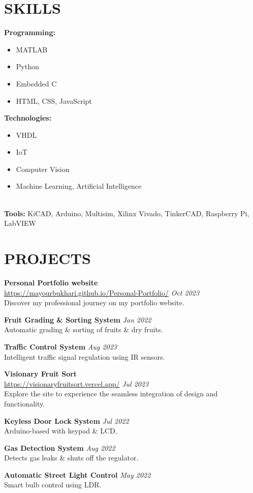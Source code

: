 \documentclass[a4paper,10pt]{article}
\begin{document}
\section{SKILLS}
\begin{minipage}{0.5\textwidth}
    \textbf{Programming:}
    \begin{itemize}[left=0pt]
        \item MATLAB
        \item Python
        \item Embedded C
        \item HTML, CSS, JavaScript
    \end{itemize}
\end{minipage}%
\begin{minipage}{0.5\textwidth}
    \textbf{Technologies:}
    \begin{itemize}[left=0pt]
        \item VHDL
        \item IoT
        \item Computer Vision
        \item Machine Learning, Artificial Intelligence 
    \end{itemize}
\end{minipage}\\

\textbf{Tools:} KiCAD, Arduino, Multisim, Xilinx Vivado, TinkerCAD, Raspberry Pi, LabVIEW

\section{PROJECTS}
\textbf{Personal Portfolio website} \\
\url{https://mayourbukhari.github.io/Personal-Portfolio/} \hfill \textit{Oct 2023} \\
Discover my professional journey on my portfolio website.

\textbf{Fruit Grading \& Sorting System} \hfill \textit{Jan 2022} \\
Automatic grading \& sorting of fruits \& dry fruits.

\textbf{Traffic Control System} \hfill \textit{Aug 2023} \\
Intelligent traffic signal regulation using IR sensors.

\textbf{Visionary Fruit Sort} \\
\url{https://visionaryfruitsort.vercel.app/} \hfill \textit{Jul 2023} \\
Explore the site to experience the seamless integration of design and functionality.

\textbf{Keyless Door Lock System} \hfill \textit{Jul 2022} \\
Arduino-based with keypad \& LCD.

\textbf{Gas Detection System} \hfill \textit{Aug 2022} \\
Detects gas leaks \& shuts off the regulator.

\textbf{Automatic Street Light Control} \hfill \textit{May 2022} \\
Smart bulb control using LDR.
\end{document}
